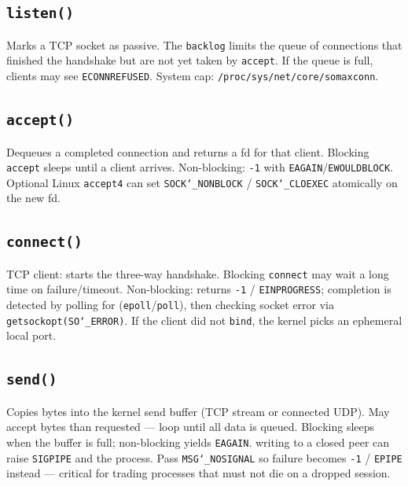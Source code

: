 \subsection{\texttt{listen()}}
\label{subsec:listen}
Marks a TCP socket as passive. The \texttt{backlog} limits the queue of connections that 
finished the handshake but are not yet taken by \texttt{accept}. If the queue is full, 
clients may see \texttt{ECONNREFUSED}. System cap: \texttt{/proc/sys/net/core/somaxconn}.

\subsection{\texttt{accept()}}
\label{subsec:accept}
Dequeues a completed connection and returns a  fd for that client. 
Blocking \texttt{accept} sleeps until a client arrives. Non-blocking: \texttt{-1} with 
\texttt{EAGAIN}/\texttt{EWOULDBLOCK}. Optional Linux \texttt{accept4} can set 
\texttt{SOCK\char`_NONBLOCK} / \texttt{SOCK\char`_CLOEXEC} atomically on the new fd.

\subsection{\texttt{connect()}}
\label{subsec:connect}
TCP client: starts the three-way handshake. Blocking \texttt{connect} may wait a long time 
on failure/timeout. Non-blocking: returns \texttt{-1} / \texttt{EINPROGRESS}; completion is 
detected by polling for  (\texttt{epoll}/\texttt{poll}), then checking 
socket error via \texttt{getsockopt(SO\char`_ERROR)}. If the client did not \texttt{bind}, the 
kernel picks an ephemeral local port.

\subsection{\texttt{send()}}
\label{subsec:send}
Copies bytes into the kernel send buffer (TCP stream or connected UDP). May accept 
 bytes than requested --- loop until all data is queued. Blocking sleeps when 
the buffer is full; non-blocking yields \texttt{EAGAIN}.
\newline
{} writing to a closed peer can raise \texttt{SIGPIPE} and 
 the process. Pass \texttt{MSG\char`_NOSIGNAL} so failure becomes \texttt{-1} / 
\texttt{EPIPE} instead --- critical for trading processes that must not die on a dropped session.

